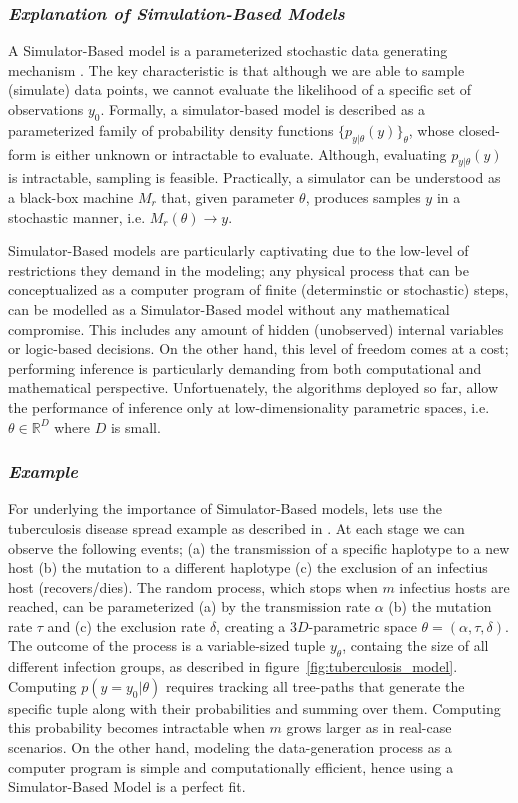 \subsubsection*{\textit{Explanation of Simulation-Based Models}}

A Simulator-Based model is a parameterized stochastic data generating mechanism \cite{Gutmann2016}. The key characteristic is that although we are able to sample (simulate) data points, we cannot evaluate the likelihood of a specific set of observations $y_0$. Formally, a simulator-based model is described as a parameterized family of probability density functions $\{p_{y|\theta}(y)\}_\theta$, whose closed-form is either unknown or intractable to evaluate. Although, evaluating $p_{y|\theta}(y)$ is intractable, sampling is feasible. Practically, a simulator can be understood as a black-box machine $M_r$ that, given parameter $\theta$, produces samples $y$ in a stochastic manner, i.e. $M_r(\theta) \rightarrow y$.

Simulator-Based models are particularly captivating due to the low-level of restrictions they demand in the modeling; any physical process that can be conceptualized as a computer program of finite (determinstic or stochastic) steps, can be modelled as a Simulator-Based model without any mathematical compromise. This includes any amount of hidden (unobserved) internal variables or logic-based decisions. On the other hand, this level of freedom comes at a cost; performing inference is particularly demanding from both computational and mathematical perspective. Unfortuenately, the algorithms deployed so far, allow the performance of inference only at low-dimensionality parametric spaces, i.e. $\theta \in \mathbb{R}^D$  where $D$ is small.

\subsubsection*{\textit{Example}}

For underlying the importance of Simulator-Based models, lets use the
tuberculosis disease spread example as described in
\cite{Tanaka2006}. At each stage we can observe the following events;
(a) the transmission of a specific haplotype to a new host (b) the
mutation to a different haplotype (c) the exclusion of an infectius
host (recovers/dies). The random process, which stops when $m$
infectius hosts are reached, can be parameterized (a) by the
transmission rate $\alpha$ (b) the mutation rate $\tau$ and (c) the
exclusion rate $\delta$, creating a $3D$-parametric space
$\theta = (\alpha, \tau, \delta)$. The outcome of the process is a
variable-sized tuple $y_\theta$, containg the size of all different
infection groups, as described in
figure~\ref{fig:tuberculosis_model}. Computing $p(y=y_0|\theta)$
requires tracking all tree-paths that generate the specific tuple
along with their probabilities and summing over them. Computing this
probability becomes intractable when $m$ grows larger as in real-case
scenarios. On the other hand, modeling the data-generation process as
a computer program is simple and computationally efficient, hence
using a Simulator-Based Model is a perfect fit.

